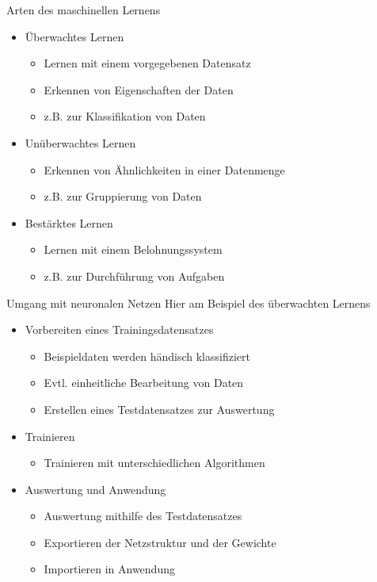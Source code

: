 \documentclass{beamer}
\begin{document}
\begin{frame}[t]{Arten des maschinellen Lernens}
\begin{itemize}
\item Überwachtes Lernen
\begin{itemize}
\item Lernen mit einem vorgegebenen Datensatz
\item Erkennen von Eigenschaften der Daten
\item z.B. zur Klassifikation von Daten
\end{itemize}
\item Unüberwachtes Lernen
\begin{itemize}
\item Erkennen von Ähnlichkeiten in einer Datenmenge
\item z.B. zur Gruppierung von Daten
\end{itemize}
\item Bestärktes Lernen
\begin{itemize}
\item Lernen mit einem Belohnungssystem
\item z.B. zur Durchführung von Aufgaben
\end{itemize}
\end{itemize}
\end{frame}

\begin{frame}[t]{Umgang mit neuronalen Netzen}
Hier am Beispiel des überwachten Lernens
\begin{itemize}
\item Vorbereiten eines Trainingsdatensatzes
\begin{itemize}
\item Beispieldaten werden händisch klassifiziert
\item Evtl. einheitliche Bearbeitung von Daten
\item Erstellen eines Testdatensatzes zur Auswertung
\end{itemize}
\item Trainieren
\begin{itemize}
\item Trainieren mit unterschiedlichen Algorithmen
\end{itemize}
\item Auswertung und Anwendung
\begin{itemize}
\item Auswertung mithilfe des Testdatensatzes
\item Exportieren der Netzstruktur und der Gewichte
\item Importieren in Anwendung
\end{itemize}
\end{itemize}
\end{frame}
\end{document}
